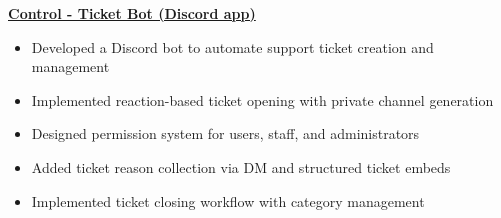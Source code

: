 \documentclass[a4paper, 12pt]{article}
\newcommand{\resumeItemsSubSection}[1]{%
\vspace{-8pt}\small \begin{itemize}\setlength{\itemsep}{-0.3em}
#1
\end{itemize}
}
\newcommand{\resumeSkillSubsection}[1]{%
\noindent \textbf{#1}\\[-6pt]
}
\begin{document}
\resumeSkillSubsection{\href{https://github.com/nzlinaldi/control}{Control - Ticket Bot (Discord app)}}

\resumeItemsSubSection{
\item Developed a Discord bot to automate support ticket creation and management
\item Implemented reaction-based ticket opening with private channel generation
\item Designed permission system for users, staff, and administrators
\item Added ticket reason collection via DM and structured ticket embeds
\item Implemented ticket closing workflow with category management
}
\end{document}

